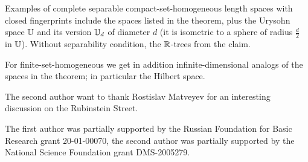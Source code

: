 \documentclass[a4paper,10pt]{article}
\begin{document}
Examples of complete separable compact-set-homogeneous length spaces with closed fingerprints include the spaces listed in the theorem,
plus the Urysohn space $\mathbb{U}$ and its version $\mathbb{U}_d$ of diameter $d$ (it is isometric to a sphere of radius $\tfrac d2$ in $\mathbb{U}$).
Without separability condition, the $\mathbb{R}$-trees from the claim.

For finite-set-homogeneous we get in addition infinite-dimensional analogs of the spaces in the theorem;
in particular the Hilbert space.

The second author want to thank Rostislav Matveyev for an interesting discussion on the Rubinstein Street. 

The first author was partially supported by the Russian Foundation for Basic Research grant 20-01-00070, 
the second author was partially supported by the National Science Foundation grant DMS-2005279.

{\sloppy
\printbibliography[heading=bibintoc]
\fussy
}
\end{document}
